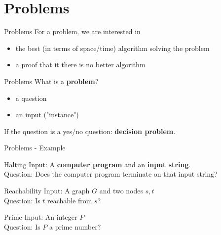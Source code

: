 \documentclass[c]{beamer}
\begin{document}
\section{Problems}
\begin{frame}{Problems}
         For a problem, we are interested in
         \begin{itemize}
			\item the best (in terms of space/time) algorithm solving the problem
			\item a proof that it there is no better algorithm
		\end{itemize}	  
	
\end{frame}

\begin{frame}{Problems}
        What is a \textbf{problem}?
         \begin{itemize}
			\item a question
			\item an input ("instance")
		\end{itemize}	 
		
		If the question is a yes/no question: \textbf{decision problem}. 		
	
\end{frame}

\begin{frame}{Problems - Example}
    \begin{block}{ Halting }
		Input: A \textbf{computer program} and an \textbf{input string}.\\
		Question: Does the computer program terminate on that input string?
    \end{block}	
	
	\begin{block}{ Reachability }
		Input: A graph $G$ and two nodes $s,t$\\
		Question: Is $t$ reachable from $s$?
    \end{block}	
    
    \begin{block}{ Prime }
		Input: An integer $P$\\
		Question: Is $P$ a prime number?
    \end{block}	
    
\end{frame}
\end{document}
